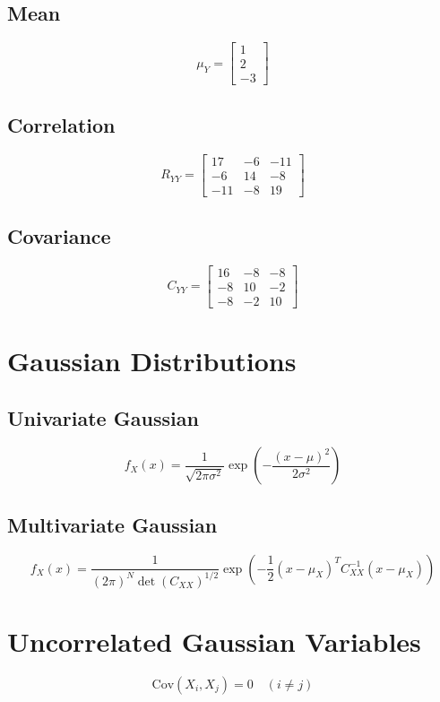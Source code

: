 \documentclass{article}
\begin{document}
\subsection{Mean}
\[
\mu_Y =
\begin{bmatrix}
1 \\ 2 \\ -3
\end{bmatrix}
\]

\subsection{Correlation}
\[
R_{YY} =
\begin{bmatrix}
17 & -6 & -11 \\
-6 & 14 & -8 \\
-11 & -8 & 19
\end{bmatrix}
\]

\subsection{Covariance}
\[
C_{YY} =
\begin{bmatrix}
16 & -8 & -8 \\
-8 & 10 & -2 \\
-8 & -2 & 10
\end{bmatrix}
\]

\section{Gaussian Distributions}

\subsection{Univariate Gaussian}
\[
f_X(x) = \frac{1}{\sqrt{2\pi\sigma^2}} 
\exp\left(-\frac{(x-\mu)^2}{2\sigma^2}\right)
\]

\subsection{Multivariate Gaussian}
\[
f_X(x) =
\frac{1}{(2\pi)^N \det(C_{XX})^{1/2}}
\exp\left(-\frac{1}{2}(x-\mu_X)^T C_{XX}^{-1}(x-\mu_X)\right)
\]

\section{Uncorrelated Gaussian Variables}

\[
\mathrm{Cov}(X_i,X_j)=0 \quad (i \ne j)
\]
\end{document}
